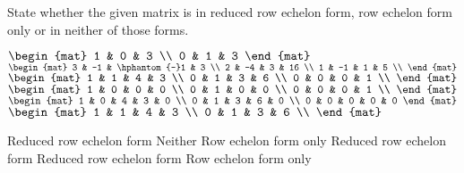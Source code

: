 
\begin{Exercise}[
name={},
title={}, 
difficulty=0,
origin={\cite{SZ}}]
State whether the given matrix is in reduced row echelon form, row echelon form only or in neither of those forms.

\begin{multicols}{2}
\Question $
\begin{mat}
1 & 0 & 3 \\ 
0 & 1 & 3  
\end{mat}
$
\Question $
\begin{mat}
3 & -1 & \hphantom{-}1 & 3 \\ 
2 & -4 & 3 & 16 \\ 
1 & -1 & 1 & 5  \\
\end{mat}
$
\Question $
\begin{mat}
1 & 1 & 4 & 3 \\ 
0 & 1 & 3 & 6 \\ 
0 & 0 & 0 & 1  \\
\end{mat}
$
\Question $
\begin{mat}
1 & 0 & 0 & 0 \\ 
0 & 1 & 0 & 0 \\ 
0 & 0 & 0 & 1  \\
\end{mat}
$
\Question $
\begin{mat}
1 & 0 & 4 & 3 & 0 \\ 
0 & 1 & 3 & 6 & 0 \\ 
0 & 0 & 0 & 0 & 0 
\end{mat}
$
\Question $
\begin{mat}
1 & 1 & 4 & 3 \\ 
0 & 1 & 3 & 6 \\
\end{mat}
$
\EndCurrentQuestion
\end{multicols}
\end{Exercise}

\begin{Answer}
\Question Reduced row echelon form
\Question Neither
\Question Row echelon form only
\Question Reduced row echelon form
\Question Reduced row echelon form
\Question Row echelon form only
\end{Answer}
